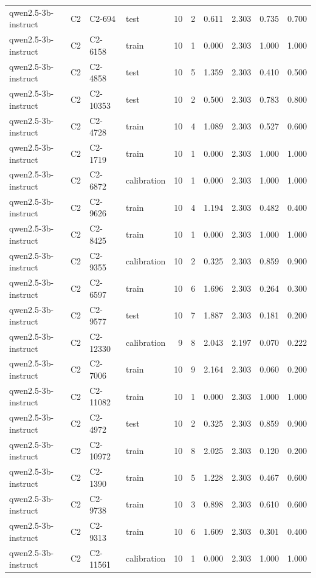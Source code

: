 \begin{table}
\begin{tabular}{llllrrrrrr}
qwen2.5-3b-instruct & C2 & C2-694 & test & 10 & 2 & 0.611 & 2.303 & 0.735 & 0.700 \\
qwen2.5-3b-instruct & C2 & C2-6158 & train & 10 & 1 & 0.000 & 2.303 & 1.000 & 1.000 \\
qwen2.5-3b-instruct & C2 & C2-4858 & test & 10 & 5 & 1.359 & 2.303 & 0.410 & 0.500 \\
qwen2.5-3b-instruct & C2 & C2-10353 & test & 10 & 2 & 0.500 & 2.303 & 0.783 & 0.800 \\
qwen2.5-3b-instruct & C2 & C2-4728 & train & 10 & 4 & 1.089 & 2.303 & 0.527 & 0.600 \\
qwen2.5-3b-instruct & C2 & C2-1719 & train & 10 & 1 & 0.000 & 2.303 & 1.000 & 1.000 \\
qwen2.5-3b-instruct & C2 & C2-6872 & calibration & 10 & 1 & 0.000 & 2.303 & 1.000 & 1.000 \\
qwen2.5-3b-instruct & C2 & C2-9626 & train & 10 & 4 & 1.194 & 2.303 & 0.482 & 0.400 \\
qwen2.5-3b-instruct & C2 & C2-8425 & train & 10 & 1 & 0.000 & 2.303 & 1.000 & 1.000 \\
qwen2.5-3b-instruct & C2 & C2-9355 & calibration & 10 & 2 & 0.325 & 2.303 & 0.859 & 0.900 \\
qwen2.5-3b-instruct & C2 & C2-6597 & train & 10 & 6 & 1.696 & 2.303 & 0.264 & 0.300 \\
qwen2.5-3b-instruct & C2 & C2-9577 & test & 10 & 7 & 1.887 & 2.303 & 0.181 & 0.200 \\
qwen2.5-3b-instruct & C2 & C2-12330 & calibration & 9 & 8 & 2.043 & 2.197 & 0.070 & 0.222 \\
qwen2.5-3b-instruct & C2 & C2-7006 & train & 10 & 9 & 2.164 & 2.303 & 0.060 & 0.200 \\
qwen2.5-3b-instruct & C2 & C2-11082 & train & 10 & 1 & 0.000 & 2.303 & 1.000 & 1.000 \\
qwen2.5-3b-instruct & C2 & C2-4972 & test & 10 & 2 & 0.325 & 2.303 & 0.859 & 0.900 \\
qwen2.5-3b-instruct & C2 & C2-10972 & train & 10 & 8 & 2.025 & 2.303 & 0.120 & 0.200 \\
qwen2.5-3b-instruct & C2 & C2-1390 & train & 10 & 5 & 1.228 & 2.303 & 0.467 & 0.600 \\
qwen2.5-3b-instruct & C2 & C2-9738 & train & 10 & 3 & 0.898 & 2.303 & 0.610 & 0.600 \\
qwen2.5-3b-instruct & C2 & C2-9313 & train & 10 & 6 & 1.609 & 2.303 & 0.301 & 0.400 \\
qwen2.5-3b-instruct & C2 & C2-11561 & calibration & 10 & 1 & 0.000 & 2.303 & 1.000 & 1.000 \\

\end{tabular}
\end{table}
